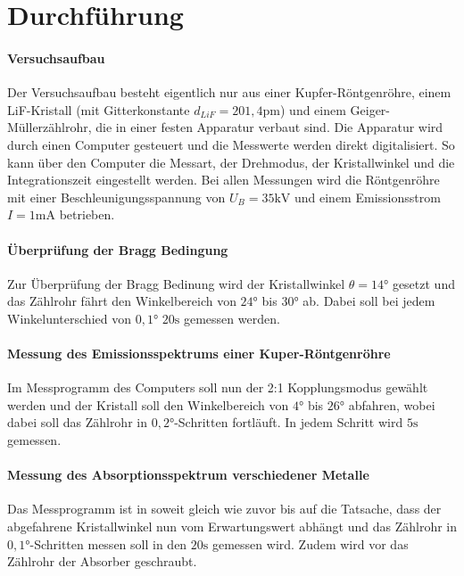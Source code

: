 \section{Durchführung}
\label{sec:Durchführung}
\paragraph{Versuchsaufbau}
Der Versuchsaufbau besteht eigentlich nur aus einer Kupfer-Röntgenröhre,
einem LiF-Kristall (mit Gitterkonstante $d_{LiF} = 201,4 \si{\pico \meter}$)
und einem Geiger-Müllerzählrohr, die in einer festen Apparatur
verbaut sind. Die Apparatur wird durch einen Computer gesteuert und die Messwerte
werden direkt digitalisiert. So kann über den Computer die Messart, der Drehmodus,
der Kristallwinkel und die Integrationszeit eingestellt werden.
Bei allen Messungen wird die Röntgenröhre mit einer Beschleunigungsspannung von
$U_B = 35 \si{\kilo \volt} $ und einem Emissionsstrom $I = 1 \si{\milli \ampere}$
betrieben.

\paragraph{Überprüfung der Bragg Bedingung}
Zur Überprüfung der Bragg Bedinung wird der Kristallwinkel $ \theta = 14 \si{\degree}$
gesetzt und das Zählrohr fährt den Winkelbereich von $24 \si{\degree}$ bis
$ 30 \si{\degree} $ ab. Dabei soll bei jedem Winkelunterschied von $ 0,1 \si{\degree}$
$20 \si{\second}$ gemessen werden.

\paragraph{Messung des Emissionsspektrums einer Kuper-Röntgenröhre}
Im Messprogramm des Computers soll nun der 2:1 Kopplungsmodus gewählt werden und
der Kristall soll den Winkelbereich von $4 \si{\degree} $ bis $26 \si{\degree}$
abfahren, wobei dabei soll das Zählrohr in $0,2 \si{\degree}$-Schritten fortläuft. In jedem Schritt wird $5\si{\second}$gemessen.

\paragraph{Messung des Absorptionsspektrum verschiedener Metalle}
Das Messprogramm ist in soweit gleich wie zuvor bis auf die Tatsache, dass
der abgefahrene Kristallwinkel nun vom Erwartungswert abhängt und das Zählrohr
in $0,1 \si{\degree}$-Schritten messen soll in den $ 20 \si{\second}$ gemessen wird.
Zudem wird vor das Zählrohr der Absorber geschraubt.
